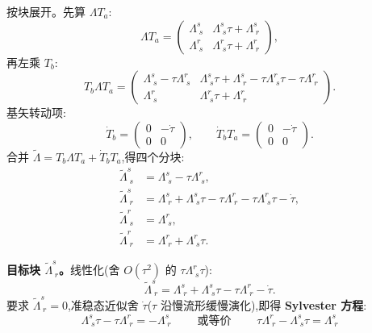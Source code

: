 \documentclass[11pt,a4paper]{article}
\begin{document}
\noindent 按块展开。先算 $\Lambda T_a$:
\begin{equation}
\Lambda T_a=\begin{pmatrix}\Lambda^{s}_{\;s} & \Lambda^{s}_{\;s}\tau+\Lambda^{s}_{\;r}\\ \Lambda^{r}_{\;s} & \Lambda^{r}_{\;s}\tau+\Lambda^{r}_{\;r}\end{pmatrix},
\end{equation}
再左乘 $T_b$:
\begin{equation}
T_b\Lambda T_a=\begin{pmatrix}\Lambda^{s}_{\;s}-\tau\Lambda^{r}_{\;s} & \Lambda^{s}_{\;s}\tau+\Lambda^{s}_{\;r}-\tau\Lambda^{r}_{\;s}\tau-\tau\Lambda^{r}_{\;r}\\[2pt] \Lambda^{r}_{\;s} & \Lambda^{r}_{\;s}\tau+\Lambda^{r}_{\;r}\end{pmatrix}.
\end{equation}
基矢转动项:
\begin{equation}
\dot T_b=\begin{pmatrix}0 & -\dot\tau\\ 0 & 0\end{pmatrix},\qquad \dot T_bT_a=\begin{pmatrix}0 & -\dot\tau\\ 0 & 0\end{pmatrix}.
\end{equation}
合并 $\widetilde\Lambda=T_b\Lambda T_a+\dot T_bT_a$,得四个分块:
\begin{align}
\widetilde\Lambda^{s}_{\;s}&=\Lambda^{s}_{\;s}-\tau\Lambda^{r}_{\;s},\\
\widetilde\Lambda^{s}_{\;r}&=\Lambda^{s}_{\;r}+\Lambda^{s}_{\;s}\tau-\tau\Lambda^{r}_{\;r}-\tau\Lambda^{r}_{\;s}\tau-\dot\tau,\\
\widetilde\Lambda^{r}_{\;s}&=\Lambda^{r}_{\;s},\\
\widetilde\Lambda^{r}_{\;r}&=\Lambda^{r}_{\;r}+\Lambda^{r}_{\;s}\tau.
\end{align}

\noindent\textbf{目标块 $\widetilde\Lambda^{s}_{\;r}$。}线性化(舍 $O(\tau^2)$ 的 $\tau\Lambda^{r}_{\;s}\tau$):
\begin{equation}
\widetilde\Lambda^{s}_{\;r}=\Lambda^{s}_{\;r}+\Lambda^{s}_{\;s}\tau-\tau\Lambda^{r}_{\;r}-\dot\tau.
\end{equation}
要求 $\widetilde\Lambda^{s}_{\;r}=0$,准稳态近似舍 $\dot\tau$($\tau$ 沿慢流形缓慢演化),即得 \textbf{Sylvester 方程}:
\begin{equation}
\boxed{\;\Lambda^{s}_{\;s}\tau-\tau\Lambda^{r}_{\;r}=-\Lambda^{s}_{\;r}\;}
\qquad\text{或等价}\qquad
\boxed{\;\tau\Lambda^{r}_{\;r}-\Lambda^{s}_{\;s}\tau=\Lambda^{s}_{\;r}\;}
\end{equation}
\end{document}
